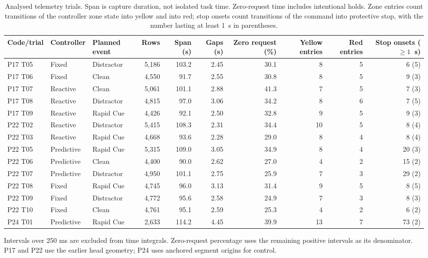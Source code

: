 \begin{table}[t]
\centering
\caption{Analysed telemetry trials. Span is capture duration, not isolated task time. Zero-request time includes intentional holds. Zone entries count transitions of the controller zone state into yellow and into red; stop onsets count transitions of the command into protective stop, with the number lasting at least 1~s in parentheses.}
\label{tab:trials}
\footnotesize
\begin{tabular}{lllrrrrrrr}
\toprule
Code/trial & Controller & Planned event & Rows & Span (s) & Gaps (s) & Zero request (\%) & Yellow entries & Red entries & Stop onsets (${\ge}1$~s) \\
\midrule
P17 T05 & Fixed & Distractor & 5,186 & 103.2 & 2.45 & 30.1 & 8 & 5 & 6 (5) \\
P17 T06 & Fixed & Clean & 4,550 & 91.7 & 2.55 & 30.8 & 8 & 5 & 9 (3) \\
P17 T07 & Reactive & Clean & 5,061 & 101.1 & 2.88 & 41.3 & 7 & 5 & 7 (3) \\
P17 T08 & Reactive & Distractor & 4,815 & 97.0 & 3.06 & 34.2 & 8 & 6 & 7 (5) \\
P17 T09 & Reactive & Rapid Cue & 4,426 & 92.1 & 2.50 & 32.8 & 9 & 5 & 9 (3) \\
P22 T02 & Reactive & Distractor & 5,415 & 108.3 & 2.31 & 34.4 & 10 & 5 & 8 (4) \\
P22 T03 & Reactive & Rapid Cue & 4,668 & 93.6 & 2.28 & 29.0 & 8 & 4 & 8 (4) \\
P22 T05 & Predictive & Rapid Cue & 5,315 & 109.0 & 3.05 & 34.9 & 8 & 4 & 20 (3) \\
P22 T06 & Predictive & Clean & 4,400 & 90.0 & 2.62 & 27.0 & 4 & 2 & 15 (2) \\
P22 T07 & Predictive & Distractor & 4,950 & 101.1 & 2.75 & 25.9 & 7 & 3 & 29 (2) \\
P22 T08 & Fixed & Rapid Cue & 4,745 & 96.0 & 3.13 & 31.4 & 9 & 5 & 8 (5) \\
P22 T09 & Fixed & Distractor & 4,772 & 95.6 & 2.58 & 24.9 & 7 & 3 & 8 (3) \\
P22 T10 & Fixed & Clean & 4,761 & 95.1 & 2.59 & 25.3 & 4 & 2 & 6 (2) \\
P24 T01 & Predictive & Rapid Cue & 2,633 & 114.2 & 4.45 & 39.9 & 13 & 7 & 73 (2) \\
\bottomrule
\end{tabular}
\par\smallskip\begin{minipage}{\linewidth}\footnotesize Intervals over 250 ms are excluded from time integrals. Zero-request percentage uses the remaining positive intervals as its denominator. P17 and P22 use the earlier head geometry; P24 uses anchored segment origins for control.\end{minipage}
\end{table}

